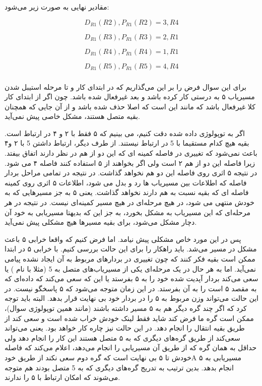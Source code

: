 \documentclass[12pt]{article}
\begin{document}
مقادیر نهایی به صورت زیر می‌شود:

$$D_{R1}(R2) , P_{R1}(R2) = 3 , R4$$


$$D_{R1}(R3) , P_{R1}(R3) = 2 , R1$$


$$D_{R1}(R4) , P_{R1}(R4) = 1 , R1$$


$$D_{R1}(R5) , P_{R1}(R5) = 4 , R4$$



\subsubsection{}

برای این سوال فرض را بر این می‌گذاریم که در ابتدای کار و تا مرحله استیبل شدن مسیریاب ۵ به درستی 
کار کرده باشد و بعد غیرفعال شده باشد. چون اگر از ابتدای کار کلا غیرفعال باشد که مانند این است که اصلا حذف شده باشد و از آن جایی که همچنان بقیه متصل هستند، مشکل خاصی پیش نمی‌آید.

اگر به توپولوژی داده شده دقت کنیم، می بینیم که ۵ فقط با ۲ و ۴ در ارتباط است. بقیه هیچ کدام مستقیما با 5 در ارتباط نیستند. از طرف دیگر، ارتباط داشتن 5 با ۲ و۴ باعث نمی‌شود که تغییری در فاصله کمینه ای که این دو از هم در نظر دارند اتفاق بیفتد. زیرا فاصله این دو از هم ۲ است ولی اگر بخواهند از ۵ استفاده کنند فاصله ۴ می شود. در نتیجه ۵ اثری روی فاصله این دو هم نخواهد گذاشت. در نتیجه در تمامی مراحل بردار فاصله که اطلاعات بین مسیریاب ها رد و بدل می شود، اطلاعات ۵ اثری روی کمینه فاصله ای که بقیه نسبت به هم دارند نخواهد گذاشت. یعنی ۵ به جز مسیرهایی که به خودش منتهی می شود، در هیچ مرحله‌ای در هیچ مسیر کمینه‌ای نیست. در نتیجه در هر مرحله‌ای که این مسیریاب به مشکل بخورد، به جز این که بدیهتا مسیریابی به خود آن دچار مشکل می‌شود، برای بقیه مسیرها هیچ مشکلی پیش نمی‌آید.


پس در این مورد خاص مشکلی پیش نیامد. اما فرض کنیم که واقعا خرابی ۵ باعث مشکل در مسیر می‌شد. باید راهکار را برای این حالت بررسی کنیم. با خرابی ۵ در ابتدا ممکن است بقیه فکر کنند که چون تغییری در بردارهای مربوط به آن ایجاد نشده پیامی نمی‌آید. اما به هر حال  در یک مرحله‌ای یکی از مسیریاب‌های متصل به 5 (مثلا با نام ) یا سعی‌ می‌کند بردار آپدیت شده خود را به ۵ بفرستد یا این که سعی می‌کند که داده‌ای که به مقصد ۵ است را به آن بفرستد. در این زمان متوجه می‌شود که ۵ پاسخگو نیست. در این حالت می‌تواند وزن مربوط به ۵ را در بردار خود بی نهایت قرار بدهد. البته باید توجه کرد که اگر چند گره دیگر هم به ۵ مسیر داشته باشند (مانند همین توپولوژی سوال)، ممکن است گره ما فرض کند شاید فقط لینک خودش خراب شده است و سعی کند از طریق بقیه انتقال را انجام دهد. در این حالت نیز  چاره کار خواهد بود. یعنی می‌تواند سعی‌کند از طریق گره‌های دیگری که به ۵ متصل هستند این کار را انجام دهد ولی حداقل به همان گره‌ که از طریق آن مسیریابی را انجام می‌دهد، اعلام می‌کند که فاصله خودش تا ۵ بی نهایت است که گره دوم سعی نکند از طریق خود\lr{ }A مسیریابی به ۵ انجام بدهد. بدین ترتیب به تدریج گره‌های دیگری که به 5 متصل بودند هم متوجه می‌شوند که امکان ارتباط با ۵ را ندارند. 
\end{document}

